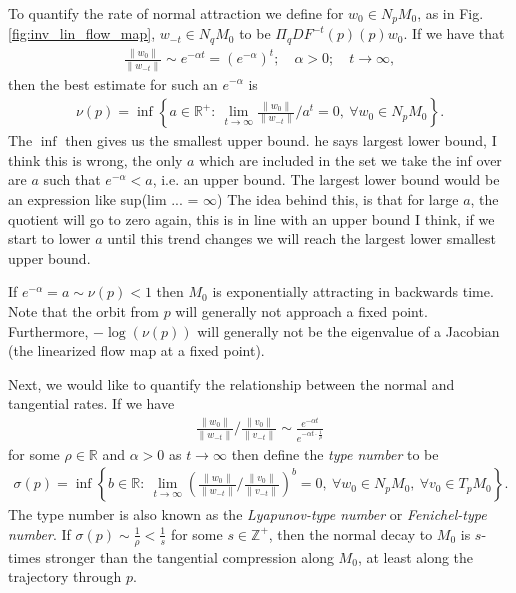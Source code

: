 To quantify the rate of normal attraction we define for $w_0 \in N_{p}M_0$, as in Fig. \ref{fig:inv_lin_flow_map}, $w_{-t}\in N_{q}M_0$ to be $\Pi_{q}DF^{-t}(p)(p)w_0 $. If we have that
\begin{align}
	\frac{\|w_0 \|}{\| w_{-t}\|}\sim e^{-\alpha t}	= (e^{-\alpha })^{t}; \quad \alpha >0; \quad t \to \infty ,
\end{align}
then the best estimate for such an $e^{-\alpha }$ is 
\begin{align}
	\boxed{
		\nu(p) = \inf \left\{ a \in \mathbb{R}^{+}:\ \lim_{t\to\infty }{\frac{\|w_0\|}{\|w_{-t}\|}}/{a^{t}} = 0,\ \forall w_0 \in N_{p}M_0 \right\}.
	}
\end{align}
The $\inf $ then gives us the smallest upper bound.
{\color{blue} he says largest lower bound, I think this is wrong, the only $a$ which are included in the set we take the inf over are $a$ such that $e^{-\alpha }<a$, i.e. an upper bound. The largest lower bound would be an expression like sup(lim ... = $\infty$) }
The idea behind this, is that for large $a$, the quotient will go to zero {\color{blue} again, this is in line with an upper bound I think}, if we start to lower $a$ until this trend changes we will reach the largest lower 
{\color{blue}smallest upper} bound.

If $e^{-\alpha }=a \sim \nu(p) < 1$ then $M_0$ is exponentially attracting in backwards time. Note that the orbit from $p$ will generally not approach a fixed point. Furthermore, $-\log(\nu(p))$ will generally not be the eigenvalue of a Jacobian (the linearized flow map at a fixed point).

Next, we would like to quantify the relationship between the normal and tangential rates. If we have
\begin{align}
{\frac{\| w_0 \|}{\|w_{-t}\|}}/{\frac{\|v_0\|}{\|v_{-t}\|}} \sim \frac{e^{-\alpha t}}{e^{-\alpha t \cdot \frac{1}{\rho}}}
\end{align}
for some $\rho \in \mathbb{R}$ and $\alpha >0$ as $t\to \infty $ then define the \emph{type number} to be
\begin{align}
	\boxed{
		\sigma(p) = \inf \left\{ b \in \mathbb{R}:\ \lim_{t\to \infty }\left({\frac{\|w_0\|}{\|w_{-t}\|}}/{\frac{\|v_0\|}{\|v_{-t}\|}}\right)^{b} = 0,\ \forall w_0 \in N_{p}M_0,\ \forall v_0 \in T_{p}M_0 \right\}.
	}
\end{align}
The type number is also known as the \emph{Lyapunov-type number} or \emph{Fenichel-type number}. If $\sigma(p) \sim \frac{1}{\rho} < \frac{1}{s}$ for some $s\in \mathbb{Z}^{+}$, then the normal decay to $M_0$ is $s$-times stronger than the tangential compression along $M_0$, at least along the trajectory through $p$.

